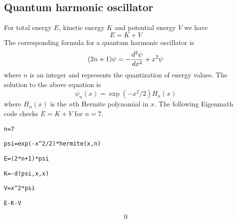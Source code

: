 \subsection{Quantum harmonic oscillator}
For total energy $E$, kinetic energy $K$ and potential energy $V$ we have
$$E=K+V$$
The corresponding formula for a quantum harmonic oscillator is
$$(2n+1)\psi=-{d^2\psi\over dx^2}+x^2\psi$$
where $n$ is an integer and represents the quantization of energy values.
The solution to the above equation is
$$\psi_n(x)=\exp(-x^2/2)H_n(x)$$
where $H_n(x)$ is the $n$th Hermite polynomial in $x$.
The following Eigenmath code checks $E=K+V$ for $n=7$.

\medskip
\verb$n=7$

\verb$psi=exp(-x^2/2)*hermite(x,n)$

\verb$E=(2*n+1)*psi$

\verb$K=-d(psi,x,x)$

\verb$V=x^2*psi$

\verb$E-K-V$

$$0$$


